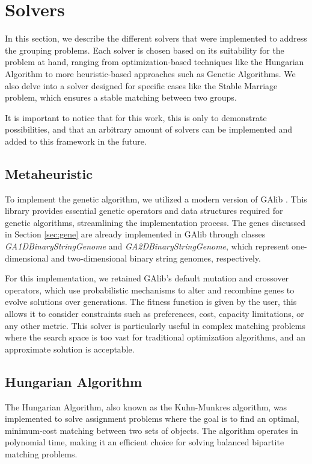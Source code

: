     \section{Solvers}
    \label{sec:solvers}
    In this section, we describe the different solvers that were implemented to address the grouping problems. Each solver is chosen based on its suitability for the problem at hand, ranging from optimization-based techniques like the Hungarian Algorithm to more heuristic-based approaches such as Genetic Algorithms. We also delve into a solver designed for specific cases like the Stable Marriage problem, which ensures a stable matching between two groups.

    It is important to notice that for this work, this is only to demonstrate possibilities, and that an arbitrary amount of solvers can be implemented and added to this framework in the future.
    
    \subsection{Metaheuristic}
    To implement the genetic algorithm, we utilized a modern version of GAlib \cite{galib}. This library provides essential genetic operators and data structures required for genetic algorithms, streamlining the implementation process. The genes discussed in Section \ref{sec:gene} are already implemented in GAlib through classes \textit{GA1DBinaryStringGenome} and \textit{GA2DBinaryStringGenome}, which represent one-dimensional and two-dimensional binary string genomes, respectively.
    
    For this implementation, we retained GAlib's default mutation and crossover operators, which use probabilistic mechanisms to alter and recombine genes to evolve solutions over generations. The fitness function is given by the user, this allows it to consider constraints such as preferences, cost, capacity limitations, or any other metric. This solver is particularly useful in complex matching problems where the search space is too vast for traditional optimization algorithms, and an approximate solution is acceptable.
    
    \subsection{Hungarian Algorithm}
    The Hungarian Algorithm, also known as the Kuhn-Munkres algorithm, was implemented to solve assignment problems where the goal is to find an optimal, minimum-cost matching between two sets of objects. The algorithm operates in polynomial time, making it an efficient choice for solving balanced bipartite matching problems\cite{kuhn1955hungarian}. 
    
